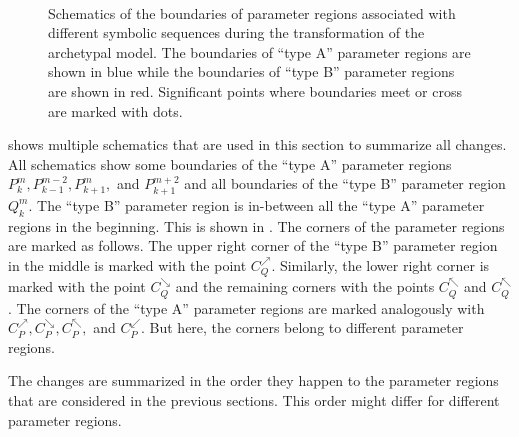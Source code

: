 \begin{figure}
{		\label{fig:add.change.schema.d}
	} \\
	\caption[Schematics of the boundaries of parameter regions associated with different symbolic sequences during the transformation of the archetypal model]{
		Schematics of the boundaries of parameter regions associated with different symbolic sequences during the transformation of the archetypal model.
		The boundaries of ``type A'' parameter regions are shown in blue while the boundaries of ``type B'' parameter regions are shown in red.
		Significant points where boundaries meet or cross are marked with dots.
	}
	\label{fig:add.change.schema}
\end{figure}

 shows multiple schematics that are used in this section to summarize all changes.
All schematics show some boundaries of the ``type A'' parameter regions $P^m_k, P^{m-2}_{k-1}, P^m_{k+1},$ and $P^{m+2}_{k+1}$ and all boundaries of the ``type B'' parameter region $Q^m_k$.
The ``type B'' parameter region is in-between all the ``type A'' parameter regions in the beginning.
This is shown in .
The corners of the parameter regions are marked as follows.
The upper right corner of the ``type B'' parameter region in the middle is marked with the point $C_Q^\nearrow$.
Similarly, the lower right corner is marked with the point $C_Q^\searrow$ and the remaining corners with the points $C_Q^\nwarrow$ and $C_Q^\nwarrow$.
The corners of the ``type A'' parameter regions are marked analogously with $C_P^\nearrow, C_P^\searrow, C_P^\nwarrow,$ and $C_P^\swarrow$.
But here, the corners belong to different parameter regions.

The changes are summarized in the order they happen to the parameter regions that are considered in the previous sections.
This order might differ for different parameter regions.

